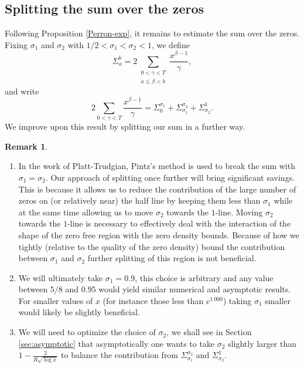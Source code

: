 \documentclass[10pt]{amsart}
\theoremstyle{definition}
\newtheorem{Rem}[prop]{Remark}
\numberwithin{equation}{section}
\begin{document}
\subsection{Splitting the sum over the zeros }\label{section-split}
Following Proposition \ref{Perron-exp}, it remains to estimate the sum over the zeros.
Fixing $\sigma_1$ and $\sigma_2$ with $1/2 < \sigma_1 < \sigma_2 < 1$, 
we define
\begin{equation}\label{Sigmaab}
\Sigma_{a}^{b}= 2\sum_{\substack{0<\gamma<T \\ a \le \beta <  b}} \frac{x^{\beta-1}}{\gamma},
\end{equation}
and write 
\begin{equation}\label{bndSums}
 2 \sum_{0<\gamma < T} \frac{x^{\beta-1}}{\gamma}=
\Sigma_{0}^{\sigma_1}+\Sigma_{\sigma_1}^{\sigma_2}+\Sigma_{\sigma_2}^1.
\end{equation}
We improve upon this result by splitting our sum in a further way.
\begin{Rem}\ \noindent
\begin{enumerate}
\item 
In the work of Platt-Trudgian, Pintz's method is used to break the sum with $\sigma_1=\sigma_2$. 
Our approach of splitting once further will bring significant savings. This is because it allows us to reduce the contribution of the large number of zeros on (or relatively near) the half line by keeping them less than $\sigma_1$
while at the same time allowing us to move $\sigma_2$ towards the $1$-line. Moving $\sigma_2$ towards the $1$-line is necessary to effectively deal with the interaction of the shape of the zero free region with the zero density bounds.
Because of how we tightly (relative to the quality of the zero density) bound the contribution between $\sigma_1$ and $\sigma_2$ further splitting of this region is not beneficial.

\item 
We will ultimately take $\sigma_1=0.9$, this choice is arbitrary and any value between $5/8$ and $0.95$ would yield similar numerical  and asymptotic results.
For smaller values of $x$ (for instance those less than $e^{1\,000}$) taking $\sigma_1$ smaller would likely be slightly beneficial.
\item 
We will need to optimize the choice of $\sigma_2$, we shall see in Section \ref{sec:asymptotic} that asymptotically one wants to take $\sigma_2$ slightly larger than $1-\frac{2}{R\sqrt{\log x}}$ to balance the contribution from 
$\Sigma_{\sigma_1}^{\sigma_2}$ and $\Sigma_{\sigma_2}^1$. 
\end{enumerate}
\end{Rem}
\end{document}
